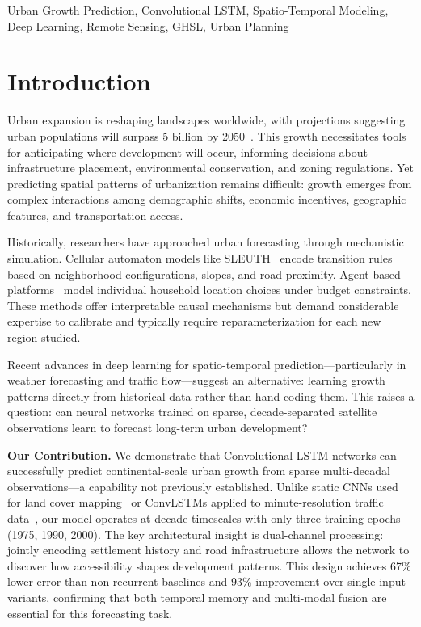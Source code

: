 \documentclass[conference]{IEEEtran}
\begin{document}
\begin{IEEEkeywords}
Urban Growth Prediction, Convolutional LSTM, Spatio-Temporal Modeling, Deep Learning, Remote Sensing, GHSL, Urban Planning
\end{IEEEkeywords}

\section{Introduction}
Urban expansion is reshaping landscapes worldwide, with projections suggesting urban populations will surpass 5 billion by 2050~\cite{un2018}. This growth necessitates tools for anticipating where development will occur, informing decisions about infrastructure placement, environmental conservation, and zoning regulations. Yet predicting spatial patterns of urbanization remains difficult: growth emerges from complex interactions among demographic shifts, economic incentives, geographic features, and transportation access.

Historically, researchers have approached urban forecasting through mechanistic simulation. Cellular automaton models like SLEUTH~\cite{clarke1997} encode transition rules based on neighborhood configurations, slopes, and road proximity. Agent-based platforms~\cite{silva2002} model individual household location choices under budget constraints. These methods offer interpretable causal mechanisms but demand considerable expertise to calibrate and typically require reparameterization for each new region studied.

Recent advances in deep learning for spatio-temporal prediction---particularly in weather forecasting and traffic flow---suggest an alternative: learning growth patterns directly from historical data rather than hand-coding them. This raises a question: can neural networks trained on sparse, decade-separated satellite observations learn to forecast long-term urban development?

\textbf{Our Contribution.} We demonstrate that Convolutional LSTM networks can successfully predict continental-scale urban growth from sparse multi-decadal observations---a capability not previously established. Unlike static CNNs used for land cover mapping~\cite{ronneberger2015} or ConvLSTMs applied to minute-resolution traffic data~\cite{zhang2018}, our model operates at decade timescales with only three training epochs (1975, 1990, 2000). The key architectural insight is dual-channel processing: jointly encoding settlement history and road infrastructure allows the network to discover how accessibility shapes development patterns. This design achieves 67\% lower error than non-recurrent baselines and 93\% improvement over single-input variants, confirming that both temporal memory and multi-modal fusion are essential for this forecasting task.
\end{document}
